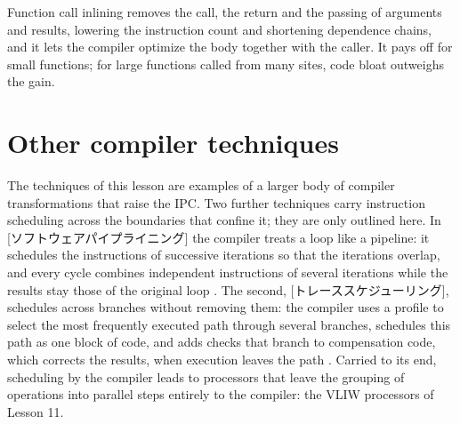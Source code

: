 \documentclass[../main.tex]{subfiles}
\begin{document}
\begin{keypoint}
  Function call inlining removes the call, the return and the passing of
  arguments and results, lowering the instruction count and shortening
  dependence chains, and it lets the compiler optimize the body together with
  the caller.  It pays off for small functions; for large functions called
  from many sites, code bloat outweighs the gain.
\end{keypoint}

\section{Other compiler techniques}
\label{sec:l10-other}

The techniques of this lesson are examples of a larger body of compiler
transformations that raise the IPC.  Two further techniques carry instruction
scheduling across the boundaries that confine it; they are only outlined here.
In [ソフトウェアパイプライニング] the compiler treats
a loop like a pipeline: it schedules the instructions of successive iterations
so that the iterations overlap, and every cycle combines independent
instructions of several iterations while the results stay those of the
original loop \cite{lam1988}.  The second, [トレーススケジューリング], schedules across branches without
removing them: the compiler uses a profile to select the most frequently executed path through
several branches, schedules this path as one block of code, and adds checks
that branch to compensation code, which corrects the results, when execution
leaves the path \cite{fisher1981}.  Carried to its end, scheduling by the
compiler leads to processors that leave the grouping of operations into
parallel steps entirely to the compiler: the VLIW processors of
Lesson 11.
\end{document}
